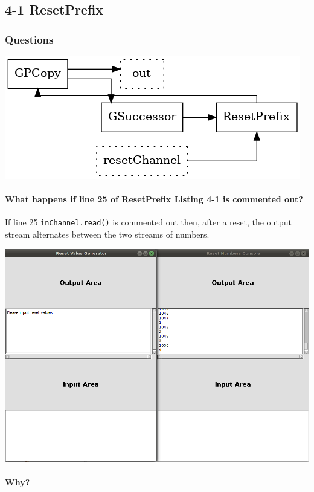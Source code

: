\subsection{4-1 ResetPrefix}

\subsubsection*{Questions}

\includegraphics[width=\textwidth]{graphs/chapter4/4-1-1.png}

\paragraph{What happens if line {25} of ResetPrefix Listing 4-1 is commented out?}

If line 25 \texttt{inChannel.read()} is commented out then, after a reset, the output stream alternates between the two streams of numbers.

\includegraphics[width=\textwidth]{img/screenshots/4-1-1.png}

\paragraph{Why?}


